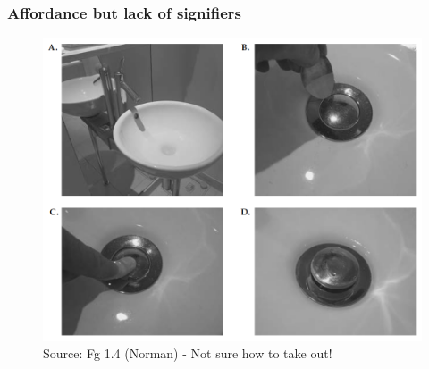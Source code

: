 \documentclass{beamer}
\begin{document}
\begin{frame}
\frametitle{Affordance but lack of signifiers}
\centering
\begin{figure}
	\includegraphics[width=0.65\linewidth]{sink}
	\caption{Source: Fg 1.4 (Norman) - Not sure how to take out!}
\end{figure}
\end{frame}
%
\end{document}
